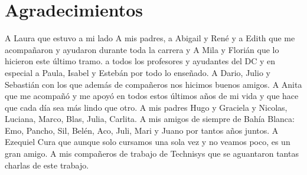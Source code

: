 \chapter*{Agradecimientos}

\noindent A Laura que estuvo a mi lado
\noindent A mis padres, a Abigail y René y a Edith que me acompañaron y ayudaron durante toda la carrera y A Mila y Florián que lo hicieron este último tramo. 
\noindent a todos los profesores y ayudantes del DC y en especial a Paula, Isabel y Estebán por todo lo enseñado.
\noindent A Dario, Julio y Sebastián con los que además de compañeros nos hicimos buenos amigos.
\noindent A Anita que me acompañó y me apoyó en todos estos últimos años de mi vida y que hace que cada día sea más lindo que otro.
\noindent A mis padres Hugo y Graciela y Nicolas, Luciana, Marco, Blas, Julia, Carlita.
\noindent A mis amigos de siempre de Bahía Blanca: Emo, Pancho, Sil, Belén, Aco, Juli, Mari y Juano por tantos años juntos.
\noindent A Ezequiel Cura que aunque solo cursamos una sola vez y no veamos poco, es un gran amigo.
\noindent A mis compañeros de trabajo de Technisys que se aguantaron tantas charlas de este trabajo.